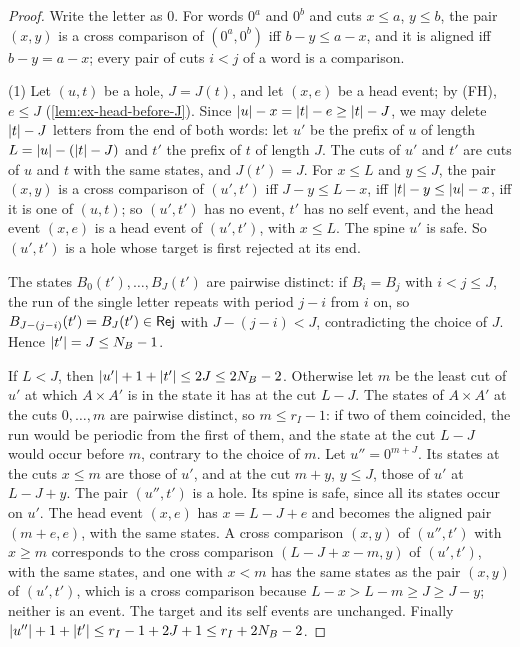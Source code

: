 \begin{proof}
Write the letter as $0$. For words $0^a$ and $0^b$ and cuts $x\le a$, $y\le b$,
the pair $(x,y)$ is a cross comparison of $(0^a,0^b)$ iff $b-y\le a-x$, and it is
aligned iff $b-y=a-x$; every pair of cuts $i<j$ of a word is a comparison.

(1) Let $(u,t)$ be a hole, $J=J(t)$, and let $(x,e)$ be a head event; by (FH),
$e\le J$ (\cref{lem:ex-head-before-J}). Since $\lvert u\rvert-x=\lvert t\rvert-e\ge\lvert t\rvert-J$,
we may delete $\lvert t\rvert-J$ letters from the end of both words: let $u'$ be the
prefix of $u$ of length $L=\lvert u\rvert-(\lvert t\rvert-J)$ and $t'$ the prefix of $t$ of
length $J$. The cuts of $u'$ and $t'$ are cuts of $u$ and $t$ with the same
states, and $J(t')=J$. For $x\le L$ and $y\le J$, the pair $(x,y)$ is a cross
comparison of $(u',t')$ iff $J-y\le L-x$, iff $\lvert t\rvert-y\le\lvert u\rvert-x$, iff it is
one of $(u,t)$; so $(u',t')$ has no event, $t'$ has no self event, and the head
event $(x,e)$ is a head event of $(u',t')$, with $x\le L$. The spine $u'$ is
safe. So $(u',t')$ is a hole whose target is first rejected at its end.

The states $B_0(t'),\ldots,B_J(t')$ are pairwise distinct: if $B_i=B_j$ with
$i<j\le J$, the run of the single letter repeats with period $j-i$ from $i$ on,
so $B_{J-(j-i)}(t')=B_J(t')\in\mathsf{Rej}$ with $J-(j-i)<J$, contradicting the choice
of $J$. Hence $\lvert t'\rvert=J\le N_B-1$.

If $L<J$, then $\lvert u'\rvert+1+\lvert t'\rvert\le2J\le2N_B-2$. Otherwise let $m$ be the
least cut of $u'$ at which $A\times A'$ is in the state it has at the cut
$L-J$. The states of $A\times A'$ at the cuts $0,\ldots,m$ are pairwise
distinct, so $m\le r_I-1$: if two of them coincided, the run would be periodic from the first of them, and the state at the cut $L-J$ would occur before $m$, contrary to the choice of $m$. Let $u''=0^{m+J}$. Its states
at the cuts $x\le m$ are those of $u'$, and at the cut $m+y$, $y\le J$, those of
$u'$ at $L-J+y$. The pair $(u'',t')$ is a hole. Its spine is safe, since all its
states occur on $u'$. The head event $(x,e)$ has $x=L-J+e$ and becomes the
aligned pair $(m+e,e)$, with the same states. A cross comparison $(x,y)$ of
$(u'',t')$ with $x\ge m$ corresponds to the cross comparison $(L-J+x-m,y)$ of
$(u',t')$, with the same states, and one with $x<m$ has the same states as the
pair $(x,y)$ of $(u',t')$, which is a cross comparison because
$L-x>L-m\ge J\ge J-y$; neither is an event. The target and its self events are
unchanged. Finally $\lvert u''\rvert+1+\lvert t'\rvert\le r_I-1+2J+1\le r_I+2N_B-2$.


\end{proof}

